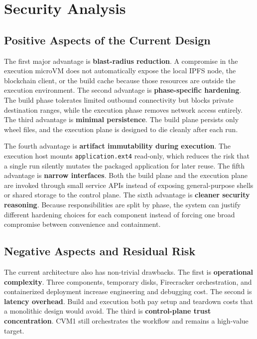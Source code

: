 \documentclass[sigconf,nonacm]{acmart}
\begin{document}
\FloatBarrier
{}
\section{Security Analysis}

\subsection{Positive Aspects of the Current Design}

The first major advantage is \textbf{blast-radius reduction}. A compromise in the execution microVM does not automatically expose the local IPFS node, the blockchain client, or the build cache because those resources are outside the execution environment. The second advantage is \textbf{phase-specific hardening}. The build phase tolerates limited outbound connectivity but blocks private destination ranges, while the execution phase removes network access entirely. The third advantage is \textbf{minimal persistence}. The build plane persists only wheel files, and the execution plane is designed to die cleanly after each run.

The fourth advantage is \textbf{artifact immutability during execution}. The execution host mounts \texttt{application.ext4} read-only, which reduces the risk that a single run silently mutates the packaged application for later reuse. The fifth advantage is \textbf{narrow interfaces}. Both the build plane and the execution plane are invoked through small service APIs instead of exposing general-purpose shells or shared storage to the control plane. The sixth advantage is \textbf{cleaner security reasoning}. Because responsibilities are split by phase, the system can justify different hardening choices for each component instead of forcing one broad compromise between convenience and containment.

\subsection{Negative Aspects and Residual Risk}

The current architecture also has non-trivial drawbacks. The first is \textbf{operational complexity}. Three components, temporary disks, Firecracker orchestration, and containerized deployment increase engineering and debugging cost. The second is \textbf{latency overhead}. Build and execution both pay setup and teardown costs that a monolithic design would avoid. The third is \textbf{control-plane trust concentration}. CVM1 still orchestrates the workflow and remains a high-value target.
\end{document}
